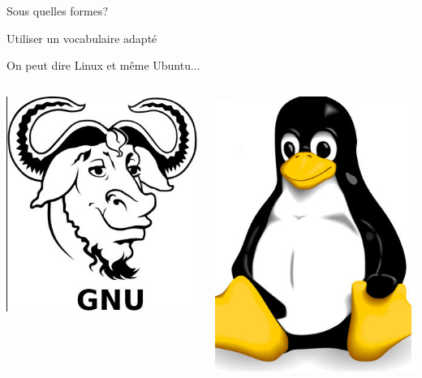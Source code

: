 \documentclass{beamer}
\begin{document}
\begin{frame}
\begin{center}
\Huge {Sous quelles formes?}
\end{center}
\end{frame}

\begin{frame}
\begin{center}
\Huge {Utiliser un vocabulaire adapté}
\end{center}
\end{frame}

\begin{frame}
\Huge{On peut dire Linux et même Ubuntu...}
\begin{columns}[c] 
\begin{center}
\includegraphics[scale=1] {./images/gnu.jpg} 
\end{center}
\begin{center}
\includegraphics[scale=1] {./images/linux.jpg} 
\end{center}
\end{columns}
\end{frame}
\end{document}
